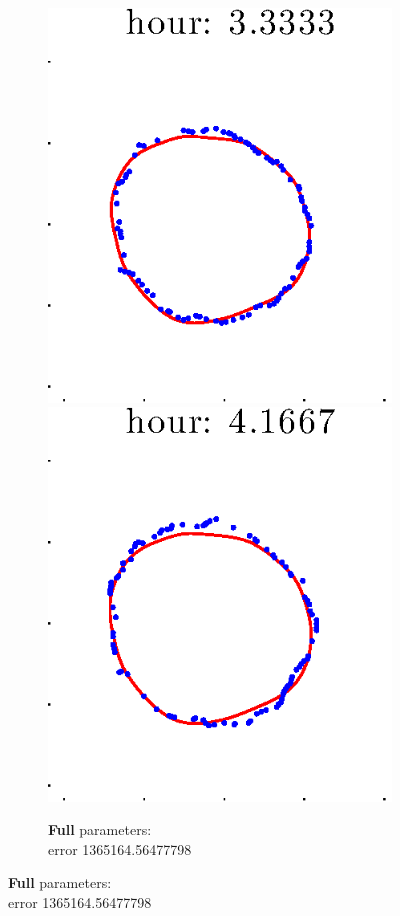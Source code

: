 \documentclass[12pt]{article}
\begin{document}
\begin{figure}[h!]
\begin{subfigure}[b]{.3\textwidth}
		\includegraphics[height=.15\textheight]{Pos5exp2/secondhalf/full5.eps}
		\includegraphics[height=.15\textheight]{Pos5exp2/secondhalf/full6.eps}
		\caption{\textbf{Full} parameters: \\error 1365164.56477798}

\end{subfigure}
\end{figure}
\end{document}
